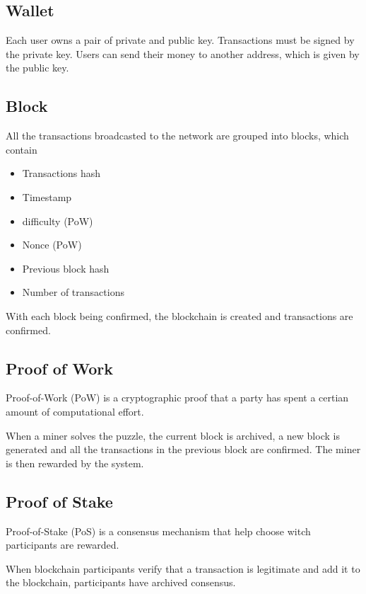\documentclass[../documentation.tex]{subfiles}
\begin{document}
\subsection{Wallet}

Each user owns a pair of private and public key.
Transactions must be signed by the private key. Users
can send their money to another address, which is given by the public key.

\subsection{Block}

All the transactions broadcasted to the network are grouped into blocks, which contain

\begin{itemize}
    \item Transactions hash
    \item Timestamp
    \item difficulty (PoW)
    \item Nonce (PoW)
    \item Previous block hash
    \item Number of transactions
\end{itemize}

With each block being confirmed, the blockchain is created
and transactions are confirmed.

\subsection{Proof of Work}

Proof-of-Work (PoW) is a cryptographic proof that a party has spent
a certian amount of computational effort.

When a miner solves the puzzle, the current block is archived, a new
block is generated and all the transactions in the previous block are confirmed.
The miner is then rewarded by the system.

\subsection{Proof of Stake}

Proof-of-Stake (PoS) is a consensus mechanism that help choose witch participants
are rewarded.

When blockchain participants verify that a transaction is legitimate and add it
to the blockchain, participants have archived consensus.
\end{document}
